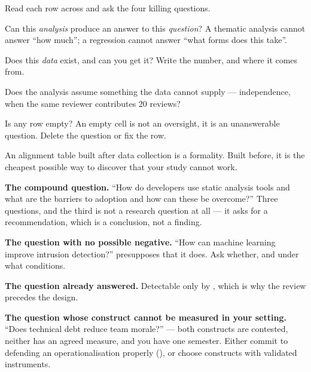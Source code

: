 \begin{conceptbox}
Read each row across and ask the four killing questions.
\begin{tightnum}
  \item Can this \emph{analysis} produce an answer to this \emph{question}? A
    thematic analysis cannot answer ``how much''; a regression cannot answer
    ``what forms does this take''.
  \item Does this \emph{data} exist, and can you get it? Write the number, and
    where it comes from.
  \item Does the analysis assume something the data cannot supply ---
    independence, when the same reviewer contributes 20 reviews?
  \item Is any row empty? An empty cell is not an oversight, it is an
    unanswerable question. Delete the question or fix the row.
\end{tightnum}
\medskip
An alignment table built after data collection is a formality. Built before, it
is the cheapest possible way to discover that your study cannot work.
\end{conceptbox}

\begin{pitfall}
\textbf{The compound question.} ``How do developers use static analysis tools
and what are the barriers to adoption and how can these be overcome?'' Three
questions, and the third is not a research question at all --- it asks for a
recommendation, which is a conclusion, not a finding.

\medskip
\textbf{The question with no possible negative.} ``How can machine learning
improve intrusion detection?'' presupposes that it does. Ask whether, and under
what conditions.

\medskip
\textbf{The question already answered.} Detectable only by , which
is why the review precedes the design.

\medskip
\textbf{The question whose construct cannot be measured in your setting.}
``Does technical debt reduce team morale?'' --- both constructs are contested,
neither has an agreed measure, and you have one semester. Either commit to
defending an operationalisation properly (), or choose
constructs with validated instruments.
\end{pitfall}


